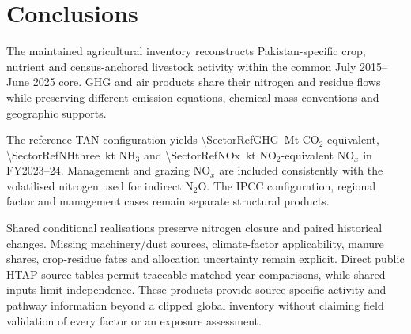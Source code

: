 \section{Conclusions}
\label{sec:conclusion}
The maintained agricultural inventory reconstructs Pakistan-specific crop, nutrient and census-anchored livestock activity within the common July 2015--June 2025 core. GHG and air products share their nitrogen and residue flows while preserving different emission equations, chemical mass conventions and geographic supports.

The reference TAN configuration yields \SI{\SectorRefGHG}{\mega\tonne} CO$_2$-equivalent, \SI{\SectorRefNHthree}{\kilo\tonne} NH$_3$ and \SI{\SectorRefNOx}{\kilo\tonne} NO$_2$-equivalent NO$_x$ in FY2023--24. Management and grazing NO$_x$ are included consistently with the volatilised nitrogen used for indirect N$_2$O. The IPCC configuration, regional factor and management cases remain separate structural products.

Shared conditional realisations preserve nitrogen closure and paired historical changes. Missing machinery/dust sources, climate-factor applicability, manure shares, crop-residue fates and allocation uncertainty remain explicit. Direct public HTAP source tables permit traceable matched-year comparisons, while shared inputs limit independence. These products provide source-specific activity and pathway information beyond a clipped global inventory without claiming field validation of every factor or an exposure assessment.
